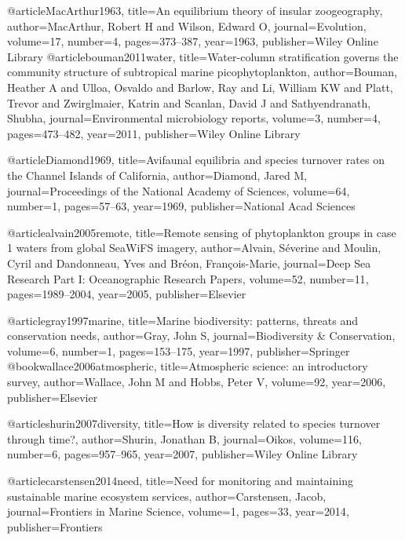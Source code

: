 {{{{{{{{{{{{@article{MacArthur1963,
  title={An equilibrium theory of insular zoogeography},
  author={MacArthur, Robert H and Wilson, Edward O},
  journal={Evolution},
  volume={17},
  number={4},
  pages={373--387},
  year={1963},
  publisher={Wiley Online Library}
}
@article{bouman2011water,
  title={Water-column stratification governs the community structure of subtropical marine picophytoplankton},
  author={Bouman, Heather A and Ulloa, Osvaldo and Barlow, Ray and Li, William KW and Platt, Trevor and Zwirglmaier, Katrin and Scanlan, David J and Sathyendranath, Shubha},
  journal={Environmental microbiology reports},
  volume={3},
  number={4},
  pages={473--482},
  year={2011},
  publisher={Wiley Online Library}
}

@article{Diamond1969,
  title={Avifaunal equilibria and species turnover rates on the Channel Islands of California},
  author={Diamond, Jared M},
  journal={Proceedings of the National Academy of Sciences},
  volume={64},
  number={1},
  pages={57--63},
  year={1969},
  publisher={National Acad Sciences}
}

@article{alvain2005remote,
  title={Remote sensing of phytoplankton groups in case 1 waters from global SeaWiFS imagery},
  author={Alvain, S{\'e}verine and Moulin, Cyril and Dandonneau, Yves and Br{\'e}on, Fran{\c{c}}ois-Marie},
  journal={Deep Sea Research Part I: Oceanographic Research Papers},
  volume={52},
  number={11},
  pages={1989--2004},
  year={2005},
  publisher={Elsevier}
}

@article{gray1997marine,
  title={Marine biodiversity: patterns, threats and conservation needs},
  author={Gray, John S},
  journal={Biodiversity \& Conservation},
  volume={6},
  number={1},
  pages={153--175},
  year={1997},
  publisher={Springer}
}
@book{wallace2006atmospheric,
  title={Atmospheric science: an introductory survey},
  author={Wallace, John M and Hobbs, Peter V},
  volume={92},
  year={2006},
  publisher={Elsevier}
}

@article{shurin2007diversity,
  title={How is diversity related to species turnover through time?},
  author={Shurin, Jonathan B},
  journal={Oikos},
  volume={116},
  number={6},
  pages={957--965},
  year={2007},
  publisher={Wiley Online Library}
}

@article{carstensen2014need,
  title={Need for monitoring and maintaining sustainable marine ecosystem services},
  author={Carstensen, Jacob},
  journal={Frontiers in Marine Science},
  volume={1},
  pages={33},
  year={2014},
  publisher={Frontiers}
}

}}}}}}}}}}}}

